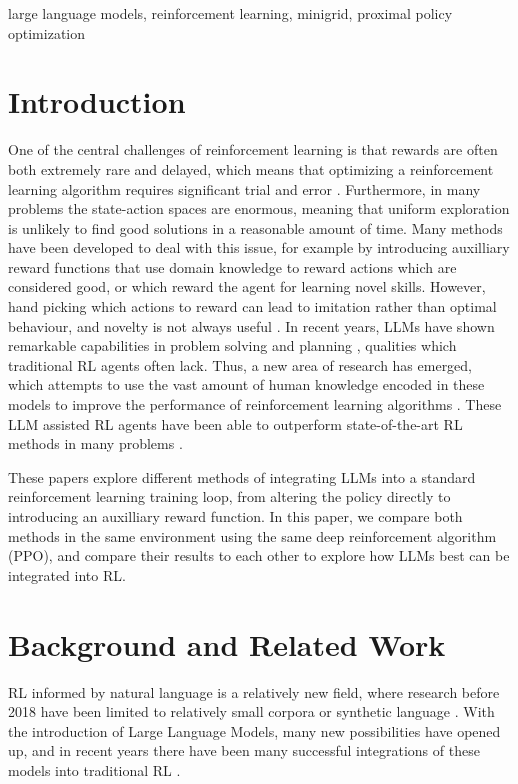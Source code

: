\documentclass[conference]{IEEEtran}
\begin{document}
\begin{IEEEkeywords}
large language models, reinforcement learning, minigrid, proximal policy optimization 
\end{IEEEkeywords}

\section{Introduction}

One of the central challenges of reinforcement learning is that rewards are often both extremely rare and delayed, which means that optimizing a reinforcement learning algorithm requires significant trial and error \cite[423]{brunton}. Furthermore, in many problems the state-action spaces are enormous, meaning that uniform exploration is unlikely to find good solutions in a reasonable amount of time. Many methods have been developed to deal with this issue, for example by introducing auxilliary reward functions that use domain knowledge to reward actions which are considered good, or which reward the agent for learning novel skills. However, hand picking which actions to reward can lead to imitation rather than optimal behaviour, and novelty is not always useful \cite[1]{ellm}. In recent years, LLMs have shown remarkable capabilities in problem solving and planning \cite{sparks}, qualities which traditional RL agents often lack. Thus, a new area of research has emerged, which attempts to use the vast amount of human knowledge encoded in these models to improve the performance of reinforcement learning algorithms \cite{survey}. These LLM assisted RL agents have been able to outperform state-of-the-art RL methods in many problems \cite{omni, ellm, idm}.

These papers explore different methods of integrating LLMs into a standard reinforcement learning training loop, from altering the policy directly to introducing an auxilliary reward function. In this paper, we compare both methods in the same environment using the same deep reinforcement algorithm (PPO), and compare their results to each other to explore how LLMs best can be integrated into RL.

\section{Background and Related Work}
\label{background}

RL informed by natural language is a relatively new field, where research before 2018 have been limited to relatively small corpora or synthetic language \cite[1]{survey}. With the introduction of Large Language Models, many new possibilities have opened up, and in recent years there have been many successful integrations of these models into traditional RL \cite{omni, ellm, idm}.
\end{document}

